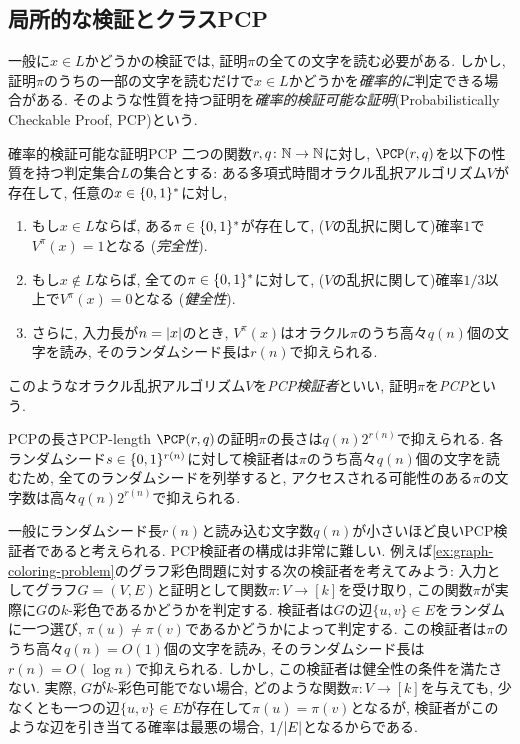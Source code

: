 \subsection{局所的な検証とクラスPCP} \label{sec:PCP}

一般に$x\in L$かどうかの検証では, 証明$\pi$の全ての文字を読む必要がある.
しかし, 証明$\pi$のうちの一部の文字を読むだけで$x\in L$かどうかを\emph{確率的に}判定できる場合がある.
そのような性質を持つ証明を\emph{確率的検証可能な証明}(Probabilistically Checkable Proof, PCP)という.


\begin{definition}{確率的検証可能な証明}{PCP}
  二つの関数$r,q\colon\mathbb{N}\to\mathbb{N}$に対し, $\PCP(r,q)$を以下の性質を持つ判定集合$L$の集合とする: ある多項式時間オラクル乱択アルゴリズム$V$が存在して, 任意の$x\in\{0,1\}^*$に対し,
  \begin{enumerate}
  \item もし$x\in L$ならば, ある$\pi\in\{0,1\}^*$が存在して, ($V$の乱択に関して)確率$1$で$V^\pi(x)=1$となる (\emph{完全性}).
  \item もし$x\notin L$ならば, 全ての$\pi\in\{0,1\}^*$に対して, ($V$の乱択に関して)確率$1/3$以上で$V^\pi(x)=0$となる (\emph{健全性}).
  \item さらに, 入力長が$n=\abs{x}$のとき, $V^\pi(x)$はオラクル$\pi$のうち高々$q(n)$個の文字を読み, そのランダムシード長は$r(n)$で抑えられる.
  \end{enumerate}
  このようなオラクル乱択アルゴリズム$V$を\emph{PCP検証者}といい, 証明$\pi$を\emph{PCP}という.
\end{definition}
\begin{remark}{PCPの長さ}{PCP-length}
  $\PCP(r,q)$の証明$\pi$の長さは$q(n)2^{r(n)}$で抑えられる.
  各ランダムシード$s \in \{0,1\}^{r(n)}$に対して検証者は$\pi$のうち高々$q(n)$個の文字を読むため, 全てのランダムシードを列挙すると, アクセスされる可能性のある$\pi$の文字数は高々$q(n)2^{r(n)}$で抑えられる.
\end{remark}

一般にランダムシード長$r(n)$と読み込む文字数$q(n)$が小さいほど良いPCP検証者であると考えられる.
PCP検証者の構成は非常に難しい.
例えば\cref{ex:graph-coloring-problem}のグラフ彩色問題に対する次の検証者を考えてみよう:
入力としてグラフ$G=(V,E)$と証明として関数$\pi\colon V\to[k]$を受け取り, この関数$\pi$が実際に$G$の$k$-彩色であるかどうかを判定する.
検証者は$G$の辺$\{u,v\}\in E$をランダムに一つ選び, $\pi(u)\neq \pi(v)$であるかどうかによって判定する.
この検証者は$\pi$のうち高々$q(n)=O(1)$個の文字を読み, そのランダムシード長は$r(n)=O(\log n)$で抑えられる.
しかし, この検証者は健全性の条件を満たさない.
実際, $G$が$k$-彩色可能でない場合, どのような関数$\pi\colon V \to [k]$を与えても, 少なくとも一つの辺$\{u,v\}\in E$が存在して$\pi(u)=\pi(v)$となるが, 検証者がこのような辺を引き当てる確率は最悪の場合, $1/\abs{E}$となるからである.

